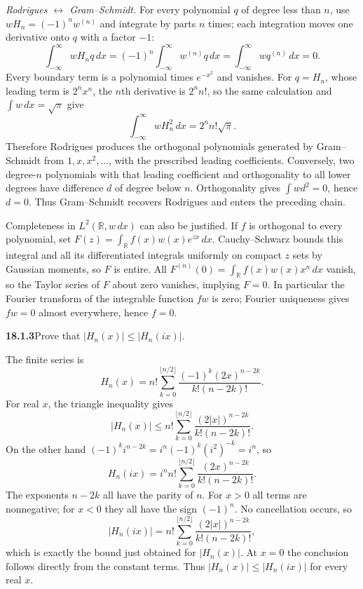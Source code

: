 \textit{Rodrigues $\longleftrightarrow$ Gram--Schmidt.}
For every polynomial $q$ of degree less than $n$, use $wH_n=(-1)^nw^{(n)}$
and integrate by parts $n$ times; each integration moves one derivative
onto $q$ with a factor $-1$:
\[
\int_{-\infty}^{\infty}wH_nq\,dx
 =(-1)^n\int_{-\infty}^{\infty}w^{(n)}q\,dx
 =\int_{-\infty}^{\infty}wq^{(n)}\,dx=0.
\]
Every boundary term is a polynomial times $e^{-x^2}$ and vanishes.
For $q=H_n$, whose leading term is $2^nx^n$, the $n$th derivative is
$2^nn!$, so the same calculation and $\int w\,dx=\sqrt\pi$ give
\[
\int_{-\infty}^{\infty}wH_n^2\,dx=2^nn!\sqrt\pi.
\]
Therefore Rodrigues produces the orthogonal polynomials generated by
Gram--Schmidt from $1,x,x^2,\ldots$, with the prescribed leading coefficients.
Conversely, two degree-$n$ polynomials with that leading coefficient and
orthogonality to all lower degrees have difference $d$ of degree below
$n$.  Orthogonality gives $\int w d^2=0$, hence $d=0$.  Thus Gram--Schmidt
recovers Rodrigues and enters the preceding chain.

Completeness in $L^2(\mathbb R,w\,dx)$ can also be justified.  If $f$
is orthogonal to every polynomial, set
$F(z)=\int_{\mathbb R}f(x)w(x)e^{zx}\,dx$.
Cauchy--Schwarz bounds this integral and all its differentiated integrals
uniformly on compact $z$ sets by Gaussian moments, so $F$ is entire.
All $F^{(n)}(0)=\int_{\mathbb R}f(x)w(x)x^n\,dx$ vanish, so the Taylor
series of $F$ about zero vanishes, implying $F=0$.  In particular the Fourier
transform of the integrable function $fw$ is zero; Fourier uniqueness
gives $fw=0$ almost everywhere, hence $f=0$.

\par\bigskip
\noindent\textbf{18.1.3}\quad Prove that
$\big|H_{n}(x)\big| \le \big|H_{n}(ix)\big|$.
\par\nobreak
\solution
{}
The finite series is
\[
H_n(x)=n!\sum_{k=0}^{\lfloor n/2\rfloor}
 \frac{(-1)^k(2x)^{n-2k}}{k!(n-2k)!}.
\]
For real $x$, the triangle inequality gives
\[
|H_n(x)|\le n!\sum_{k=0}^{\lfloor n/2\rfloor}
 \frac{(2|x|)^{n-2k}}{k!(n-2k)!}.
\]
On the other hand $(-1)^ki^{n-2k}=i^n(-1)^k(i^2)^{-k}=i^n$, so
\[
H_n(ix)=i^nn!\sum_{k=0}^{\lfloor n/2\rfloor}
 \frac{(2x)^{n-2k}}{k!(n-2k)!}.
\]
The exponents $n-2k$ all have the parity of $n$.  For $x>0$
all terms are nonnegative; for $x<0$ they all have the sign $(-1)^n$.
No cancellation occurs, so
\[
|H_n(ix)|=n!\sum_{k=0}^{\lfloor n/2\rfloor}
 \frac{(2|x|)^{n-2k}}{k!(n-2k)!},
\]
which is exactly the bound just obtained for $|H_n(x)|$.
At $x=0$ the conclusion follows directly from the constant terms.
Thus $\boxed{|H_n(x)|\le|H_n(ix)|}$ for every real $x$.

